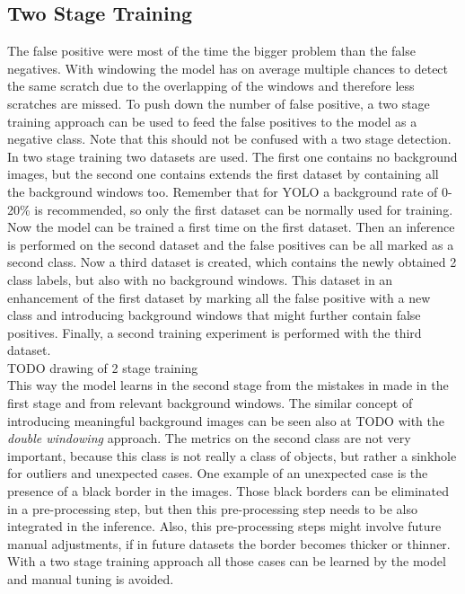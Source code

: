 \subsection{Two Stage Training}
The false positive were most of the time the bigger problem than the false negatives. With windowing the model has on average multiple chances to detect the same scratch due to the overlapping of the windows and therefore less scratches are missed. To push down the number of false positive, a two stage training approach can be used to feed the false positives to the model as a negative class. Note that this should not be confused with a two stage detection. \\
In two stage training two datasets are used. The first one contains no background images, but the second one contains extends the first dataset by containing all the background windows too. Remember that for YOLO a background rate of 0-20\% is recommended, so only the first dataset can be normally used for training. Now the model can be trained a first time on the first dataset. Then an inference is performed on the second dataset and the false positives can be all marked as a second class. Now a third dataset is created, which contains the newly obtained 2 class labels, but also with no background windows. This dataset in an enhancement of the first dataset by marking all the false positive with a new class and introducing background windows that might further contain false positives. Finally, a second training experiment is performed with the third dataset. \\
TODO drawing of 2 stage training \\
This way the model learns in the second stage from the mistakes in made in the first stage and from relevant background windows. The similar concept of introducing meaningful background images can be seen also at TODO with the \textit{double windowing} approach. The metrics on the second class are not very important, because this class is not really a class of objects, but rather a sinkhole for outliers and unexpected cases. One example of an unexpected case is the presence of a black border in the images. Those black borders can be eliminated in a pre-processing step, but then this pre-processing step needs to be also integrated in the inference. Also, this pre-processing steps might involve future manual adjustments, if in future datasets the border becomes thicker or thinner. With a two stage training approach all those cases can be learned by the model and manual tuning is avoided.\\
